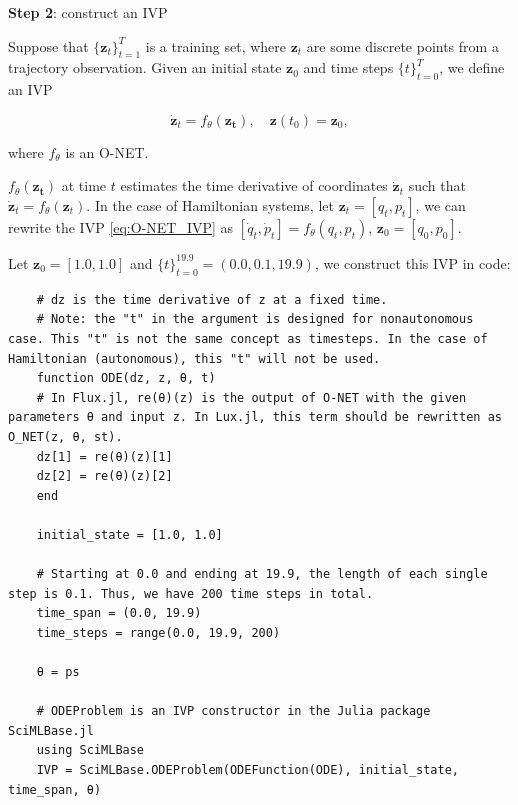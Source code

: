 \documentclass[
	parskip, 			   %
	twoside, 			   %
	DIV=14, 			   %
	BCOR=15.0mm, 		   %
	headsepline, 		   %
	open=right, 		   %
	captions=tableheading, %
	bibliography=totoc,    %
	numbers=noenddot       %
]{scrreprt}
\begin{document}
\textbf{Step 2}: construct an IVP

Suppose that $\{ \mathbf{z}_{t} \}_{t=1}^{T}$ is a training set, where $\mathbf{z}_{t}$ are some discrete points from a trajectory observation. Given an initial state $\mathbf{z}_{0}$ and time steps $\{ t \}_{t=0}^{T}$, we define an IVP

\begin{equation}
    \label{eq:O-NET_IVP}
    \dot{\mathbf{z}}_t = f_{\theta}(\mathbf{z_t}), \quad \mathbf{z}(t_{0}) = \mathbf{z}_{0},
\end{equation}

where $f_{\theta}$ is an O-NET.

$f_{\theta}(\mathbf{z_t})$ at time $t$ estimates the time derivative of coordinates $\dot{\mathbf{z}}_{t}$ such that $\dot{ \mathbf{z}}_{t} = f_{\theta}(\mathbf{z}_t)$. In the case of Hamiltonian systems, let $\mathbf{z}_{t} = [q_{t}, p_{t}]$, we can rewrite the IVP \ref{eq:O-NET_IVP} as $[\dot q_{t}, \dot p_{t}] = f_{\theta}(q_t, p_t)$, $\mathbf{z}_{0}= [q_{0}, p_{0}]$.

Let $\mathbf{z}_{0}=[1.0, 1.0]$ and $\{ t \}_{t=0}^{19.9} = (0.0, 0.1, 19.9)$, we construct this IVP in code:

\begin{verbatim}
    # dz is the time derivative of z at a fixed time.
    # Note: the "t" in the argument is designed for nonautonomous case. This "t" is not the same concept as timesteps. In the case of Hamiltonian (autonomous), this "t" will not be used.
    function ODE(dz, z, θ, t)
    # In Flux.jl, re(θ)(z) is the output of O-NET with the given parameters θ and input z. In Lux.jl, this term should be rewritten as O_NET(z, θ, st).
    dz[1] = re(θ)(z)[1]
    dz[2] = re(θ)(z)[2]
    end
    
    initial_state = [1.0, 1.0]
    
    # Starting at 0.0 and ending at 19.9, the length of each single step is 0.1. Thus, we have 200 time steps in total.
    time_span = (0.0, 19.9)
    time_steps = range(0.0, 19.9, 200)
    
    θ = ps
    
    # ODEProblem is an IVP constructor in the Julia package SciMLBase.jl
    using SciMLBase
    IVP = SciMLBase.ODEProblem(ODEFunction(ODE), initial_state, time_span, θ)
\end{verbatim}
\end{document}

